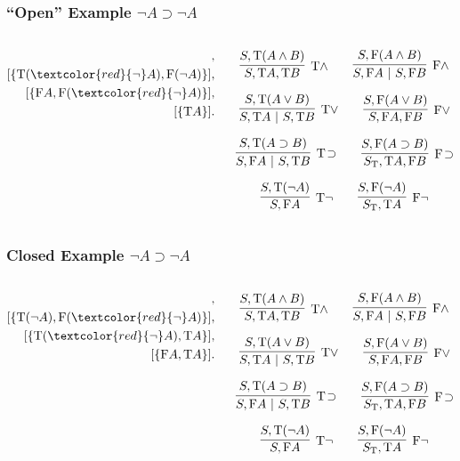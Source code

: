 \documentclass[mathserif]{beamer}
\def\|{~|~}
\def\T{\textrm{T}}
\def\F{\textrm{F}}
\def\imp{\supset}
\newcommand{\diff}[1]{\textcolor{red}{#1}}
\def\mycalc{
$$
\infer
  [\T \land]
  {S , \T A , \T B}
{
  {S , \T(A \land B)}
}
\qquad
\infer
  [\F \land]
  {S, \F A \| S, \F B}
{
  {S, \F(A \land B)}
}
$$

$$
\infer
  [\T \lor]
  {S , \T A \| S , \T B}
{
  {S , \T(A \lor B)}
}
\qquad
\infer
  [\F \lor]
  {S, \F A , \F B}
{
  {S, \F(A \lor B)}
}
$$

$$
\infer
  [\T \! \imp]
  {S , \F A \| S , \T B}
{
  {S , \T(A \imp B)}
}
\qquad
\infer
  [\F \! \imp]
  {S_{\T}, \T A , \F B}
{
  {S, \F(A \imp B)}
}
$$

$$
\infer
  [\T \neg]
  {S , \F A}
{
  {S , \T(\neg A)}
}
\qquad
\infer
  [\F \neg]
  {S_{\T}, \T A}
{
  {S, \F(\neg A)}
}
$$
}
\begin{document}
\begin{frame}
\frametitle{``Open'' Example $\neg A \imp \neg A$}

\begin{columns}[T]
\begin{column}[T]{4cm}
\begin{align*}
[\{ \F(\neg A \diff{\imp} \neg A) \}],\\
[\{ \T(\diff{\neg} A), \F(\neg A) \}],\\
[\{ \F A, \F(\diff{\neg} A) \}],\\
[\{ \T A \}].
\end{align*}
\end{column}

\begin{column}[T]{7cm}
\mycalc
\end{column}
\end{columns}

\end{frame}

\begin{frame}
\frametitle{Closed Example $\neg A \imp \neg A$}

\begin{columns}[T]
\begin{column}[T]{4cm}
\begin{align*}
[\{ \F(\neg A \diff{\imp} \neg A) \}],\\
[\{ \T(\neg A), \F(\diff{\neg} A) \}],\\
[\{ \T(\diff{\neg} A), \T A \}],\\
[\{ \F A, \T A \}].
\end{align*}
\end{column}

\begin{column}[T]{7cm}
\mycalc
\end{column}
\end{columns}

\end{frame}
\end{document}
